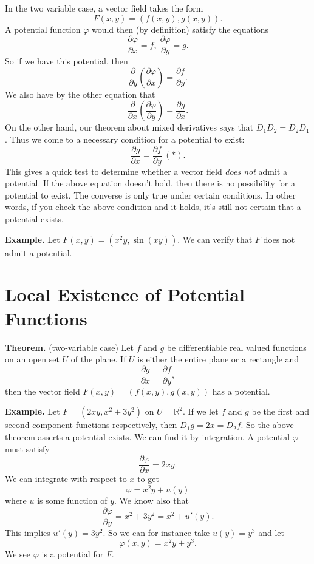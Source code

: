 \documentclass{article}
\begin{document}
In the two variable case, a vector field takes the form 
\[F(x,y) = (f(x,y), g(x,y)).\]
A potential function $\varphi$ would then (by definition) satisfy the equations
\[\frac{\partial \varphi}{\partial x} = f,\ \frac{\partial \varphi}{\partial y} = g.\]
So if we have this potential, then 
\[ \frac{\partial}{\partial y}\left(\frac{\partial \varphi}{\partial x} \right) = \frac{\partial f}{\partial y}. \]
We also have by the other equation that 
\[ \frac{\partial}{\partial x}\left(\frac{\partial \varphi}{\partial y} \right) = \frac{\partial g}{\partial x}.\]
On the other hand, our theorem about mixed derivatives says that $D_1 D_2 = D_2 D_1$. Thus we come to a 
necessary condition for a potential to exist:
\[\frac{\partial g}{\partial x}=\frac{\partial f}{\partial y}\ (*).\]
This gives a quick test to determine whether a vector field \emph{does not} admit a potential. If the above
equation doesn't hold, then there is no possibility for a potential to exist. The converse is only
true under certain conditions. In other words, if you check the above condition and it holds, it's
still not certain that a potential exists.

\textbf{Example.} Let $F(x,y) = (x^2 y, \sin(xy))$. We can verify that $F$ does not admit a potential.

\section*{Local Existence of Potential Functions}

\textbf{Theorem.} (two-variable case) Let $f$ and $g$ be differentiable real valued functions on an open set $U$ of the plane.
If $U$ is either the entire plane or a rectangle and 
\[\frac{\partial g}{\partial x}=\frac{\partial f}{\partial y},\]
then the vector field $F(x,y) = (f(x,y),g(x,y))$ has a potential.

\textbf{Example.} Let $F = (2xy, x^2 + 3y^2)$ on $U = \mathbb{R}^2$. If we let $f$ and $g$ be the first and second
component functions respectively, then $D_1 g = 2x = D_2 f$. So the above theorem asserts a potential exists.
We can find it by integration. A potential $\varphi$ must satisfy
\[\frac{\partial \varphi}{\partial x} = 2xy.\]
We can integrate with respect to $x$ to get 
\[\varphi = x^2y + u(y)\]
where $u$ is some function of $y$. We know also that 
\[\frac{\partial \varphi}{\partial y} = x^2 + 3y^2 = x^2 + u'(y).\]
This implies $u'(y) = 3y^2$. So we can for instance take $u(y) = y^3$ and let
\[\varphi(x,y) = x^2y + y^3.\]
We see $\varphi$ is a potential for $F$.
\end{document}
